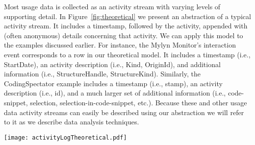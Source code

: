 Most usage data is collected as an activity stream with varying levels of supporting detail. In Figure~\ref{fig:theoretical} we present an abstraction of a typical activity stream. It includes a timestamp, followed by the activity, appended with (often anonymous) details concerning that activity. We can apply this model to the examples discussed earlier. For instance, the Mylyn Monitor's interaction event corresponds to a row in our theoretical model. It includes a timestamp (i.e., StartDate), an activity description (i.e., Kind, OriginId), and additional information (i.e., StructureHandle, StructureKind). Similarly, the CodingSpectator example includes a timestamp (i.e., stamp), an activity description (i.e., id), and a much larger set of additional information (i.e., code-snippet, selection, selection-in-code-snippet, etc.). Because these and other usage data activity streams can easily be described using our abstraction we will refer to it as we describe data analysis techniques.









\begin{figure*}[t]
 \centering
\texttt{[image: activityLogTheoretical.pdf]}
\caption{Abstract model of developer activity streams.}
\label{fig:theoretical}
\end{figure*}




